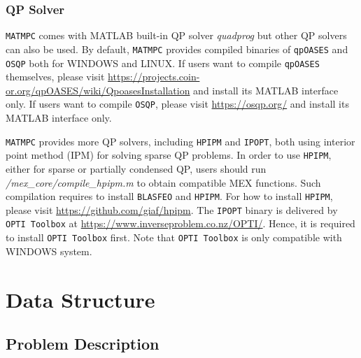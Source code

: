 \documentclass{article}
\newcommand{\software}[1]{{\tt#1}}
\begin{document}
\subsubsection{QP Solver}
\software{MATMPC} comes with MATLAB built-in QP solver \emph{quadprog} but other QP solvers can also be used. By default, \software{MATMPC} provides compiled binaries of \software{qpOASES} and \software{OSQP} both for WINDOWS and LINUX. If users want to compile \software{qpOASES} themselves, please visit \url{https://projects.coin-or.org/qpOASES/wiki/QpoasesInstallation} and install its MATLAB interface only. If users want to compile \software{OSQP}, please visit \url{https://osqp.org/} and install its MATLAB interface only.

\software{MATMPC} provides more QP solvers, including \software{HPIPM} and \software{IPOPT}, both using interior point method (IPM) for solving sparse QP problems. In order to use \software{HPIPM}, either for sparse or partially condensed QP, users should run \emph{/mex\_core/compile\_hpipm.m} to obtain compatible MEX functions. Such compilation requires to install \software{BLASFEO} and \software{HPIPM}. For how to install \software{HPIPM}, please visit \url{https://github.com/giaf/hpipm}. The \software{IPOPT} binary is delivered by \software{OPTI Toolbox} at \url{https://www.inverseproblem.co.nz/OPTI/}. Hence, it is required to install \software{OPTI Toolbox} first. Note that \software{OPTI Toolbox} is only compatible with WINDOWS system.

\section{Data Structure}

\subsection{Problem Description}
\end{document}
